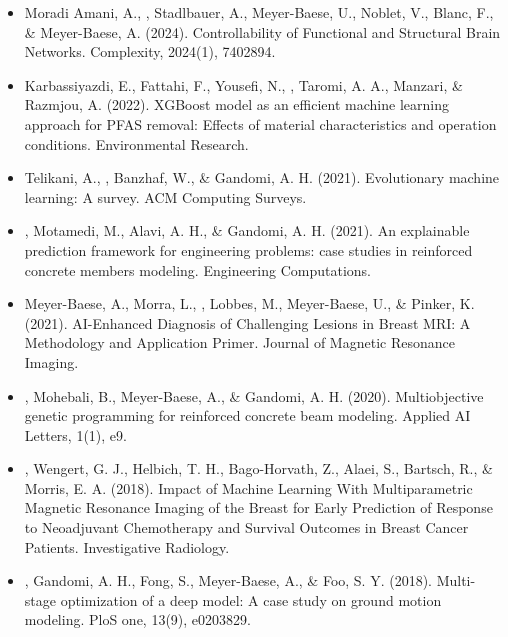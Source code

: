 \documentclass[]{template}
\begin{document}
\sectionsep 
{}
\begin{itemize}

\item Moradi Amani, A., , Stadlbauer, A., Meyer-Baese, U., Noblet, V., Blanc, F., \& Meyer-Baese, A. (2024). Controllability of Functional and Structural Brain Networks. Complexity, 2024(1), 7402894.    

\item Karbassiyazdi, E., Fattahi, F., Yousefi, N., , Taromi, A. A., Manzari, \& Razmjou, A. (2022). XGBoost model as an efficient machine learning approach for PFAS removal: Effects of material characteristics and operation conditions. Environmental Research.

\item Telikani, A., , Banzhaf, W., \& Gandomi, A. H. (2021). Evolutionary machine learning: A survey. ACM Computing Surveys.

\item {}, Motamedi, M., Alavi, A. H., \& Gandomi, A. H. (2021). An explainable prediction framework for engineering problems: case studies in reinforced concrete members modeling. Engineering Computations.

\item Meyer-Baese, A., Morra, L., , Lobbes, M., Meyer-Baese, U., \& Pinker, K. (2021). AI-Enhanced Diagnosis of Challenging Lesions in Breast MRI: A Methodology and Application Primer. Journal of Magnetic Resonance Imaging.

\item {}, Mohebali, B., Meyer-Baese, A., \& Gandomi, A. H. (2020). Multiobjective genetic programming for reinforced concrete beam modeling. Applied AI Letters, 1(1), e9.

\item {}, Wengert, G. J., Helbich, T. H., Bago-Horvath, Z., Alaei, S., Bartsch, R., \& Morris, E. A. (2018). Impact of Machine Learning With Multiparametric Magnetic Resonance Imaging of the Breast for Early Prediction of Response to Neoadjuvant Chemotherapy and Survival Outcomes in Breast Cancer Patients. Investigative Radiology.

\item {}, Gandomi, A. H., Fong, S., Meyer-Baese, A., \& Foo, S. Y. (2018). Multi-stage optimization of a deep model: A case study on ground motion modeling. PloS one, 13(9), e0203829.



\end{itemize}
\end{document}
